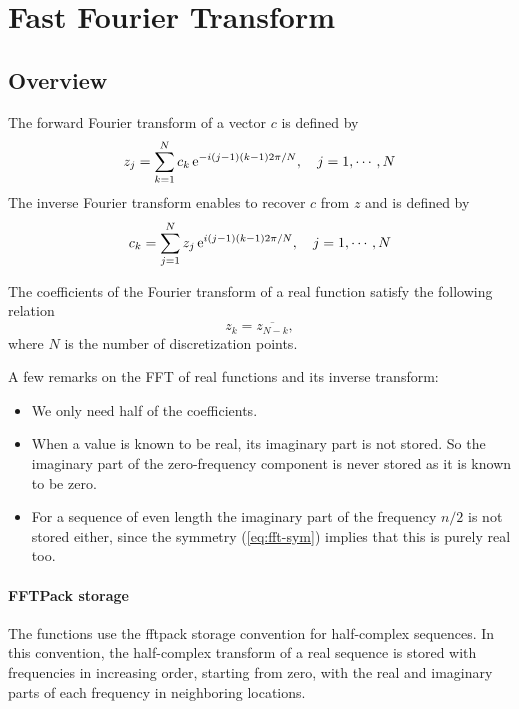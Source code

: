 \section{Fast Fourier Transform}
\subsection{Overview}

The forward Fourier transform of a vector $c$ is defined by
\begin{equation*}
  z_j = \sum_{k=1}^N c_k \operatorname{e}^{ -i (j-1) (k-1) 2 \pi / N }, \quad j=1,\cdots,N
\end{equation*}
The inverse Fourier transform enables to recover $c$ from $z$ and is defined by
\begin{equation*}
  c_k = \sum_{j=1}^N z_j \operatorname{e}^{ i (j-1) (k-1) 2 \pi / N }, \quad j=1,\cdots,N
\end{equation*}


The coefficients of the Fourier transform of a real function satisfy the
following relation
\begin{equation}
  \label{eq:fft-sym}
  z_k = \overline{z_{N-k}},
\end{equation}
where $N$ is the number of discretization points.

A few remarks on the FFT of real functions and its inverse transform:
\begin{itemize}
\item We only need half of the coefficients.
\item When a value is known to be real, its imaginary part is not stored.
  So the imaginary part of the zero-frequency component is never stored as it is
  known to be zero.
\item For a sequence of even length the imaginary part of the frequency
  $n/2$ is not stored either, since the symmetry (\ref{eq:fft-sym}) implies
  that this is purely real too.
\end{itemize}


\paragraph{FFTPack storage}
\label{sec:fftpack-storage}

The functions use the fftpack storage convention for half-complex sequences.
In this convention, the half-complex transform of a real sequence is stored
with frequencies in increasing order, starting from zero, with the real and
imaginary parts of each frequency in neighboring locations.

